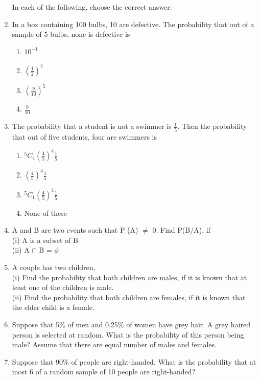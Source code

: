 \begin{enumerate}[label=\arabic*.,ref=\thesubsection.\theenumi]
In each of the following, choose the correct answer:\\
\item In a box containing 100 bulbs, 10 are defective. The probability that out of a
sample of 5 bulbs, none is defective is
\begin{enumerate}
\item $10^{-1}$
\item $(\frac{1}{2})^5$
\item $(\frac{9}{10})^5$
\item $\frac{9}{10}$
\end{enumerate}
\item The probability that a student is not a swimmer is $\frac{1}{5}$. Then the probability that out of five students, four are swimmers is\\
\begin{enumerate}
\item $^5C_4 (\frac{4}{5})^4 \frac{1}{5}$
\item $(\frac{4}{5})^4 \frac{1}{5}$
\item $^5C_1 (\frac{4}{5})^4 \frac{1}{5}$
\item None of these
\end{enumerate}
\item A and B are two events such that P (A) $\neq$ 0. Find P(B/A), if\\
(i) A is a subset of B \\
(ii) A $\cap$ B = $\phi$\\

\item A couple has two children,\\
(i) Find the probability that both children are males, if it is known that at least one of the children is male.\\
(ii) Find the probability that both children are females, if it is known that the elder child is a female.\\

\item Suppose that 5$\%$ of men and 0.25$\%$ of women have grey hair. A grey haired person is selected at random. What is the probability of this person being male? Assume that there are equal number of males and females.\\

\item Suppose that 90$\%$ of people are right-handed. What is the probability that
at most 6 of a random sample of 10 people are right-handed?\\


\end{enumerate}
